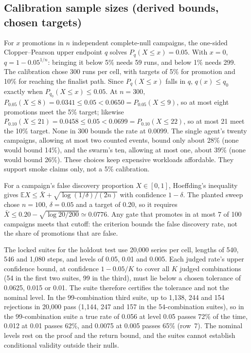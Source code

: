 \documentclass[11pt]{article}
\newcommand{\E}{\mathbb{E}}
\begin{document}
\subsection{Calibration sample sizes (derived bounds, chosen targets)}\label{app:calibration}

For $x$ promotions in $n$ independent complete-null campaigns, the one-sided Clopper--Pearson upper endpoint $q$ solves $P_q(X\le x)=0.05$. With $x=0$, $q=1-0.05^{1/n}$: bringing it below 5\% needs 59 runs, and below 1\% needs 299. The calibration chose 300 runs per cell, with targets of 5\% for promotion and 10\% for reaching the finalist path. Since $P_q(X\le x)$ falls in $q$, $q(x)\le q_0$ exactly when $P_{q_0}(X\le x)\le0.05$. At $n=300$, $P_{0.05}(X\le8)=0.0341\le0.05<0.0650=P_{0.05}(X\le9)$, so at most eight promotions meet the 5\% target; likewise $P_{0.10}(X\le21)=0.0458\le0.05<0.0699=P_{0.10}(X\le22)$, so at most 21 meet the 10\% target. None in 300 bounds the rate at 0.0099. The single agent's twenty campaigns, allowing at most two counted events, bound only about 28\% (none would bound 14\%), and the swarm's ten, allowing at most one, about 39\% (none would bound 26\%). These choices keep expensive workloads affordable. They support smoke claims only, not a 5\% calibration.

For a campaign's false discovery proportion $X\in[0,1]$, Hoeffding's inequality gives $\E X\le\bar X+\sqrt{\log(1/\delta)/(2n)}$ with confidence $1-\delta$. The planted sweep chose $n=100$, $\delta=0.05$ and a target of 0.20, so it requires $\bar X\le0.20-\sqrt{\log20/200}\simeq0.0776$. Any gate that promotes in at most 7 of 100 campaigns meets that cutoff: the criterion bounds the false discovery rate, not the share of promotions that are false.

The locked suites for the holdout test use 20{,}000 series per cell, lengths of 540, 546 and 1{,}080 steps, and levels of 0.05, 0.01 and 0.005. Each judged rate's upper confidence bound, at confidence $1-0.05/K$ to cover all $K$ judged combinations (54 in the first two suites, 99 in the third), must lie below a chosen tolerance of 0.0625, 0.015 or 0.01. The suite therefore certifies the tolerance and not the nominal level. In the 99-combination third suite, up to 1{,}138, 244 and 154 rejections in 20{,}000 pass (1{,}144, 247 and 157 in the 54-combination suites), so in the 99-combination suite a true rate of 0.056 at level 0.05 passes 72\% of the time, 0.012 at 0.01 passes 62\%, and 0.0075 at 0.005 passes 65\% (row~7). The nominal levels rest on the proof and the return bound, and the suites cannot establish conditional validity outside their nulls.
\end{document}
